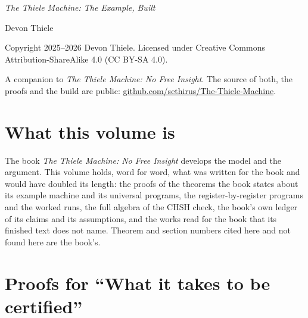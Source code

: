 \documentclass[11pt,twoside]{article}
\theoremstyle{thielethm}
\theoremstyle{thieledef}
\theoremstyle{thieledef}
\theoremstyle{thieledef}
\theoremstyle{thielethm}
\theoremstyle{thieleobs}
\theoremstyle{thielethm}
\begin{document}
\hypersetup{pageanchor=false}
\pagestyle{empty}
\vspace*{112pt}
\noindent{}

\vspace{42pt}

\vspace{7pt}
\clearpage

\vspace*{\fill}
\begingroup\footnotesize\setlength{\parindent}{0pt}\setlength{\parskip}{5pt}
\noindent\textit{The Thiele Machine: The Example, Built}

Devon Thiele

Copyright 2025--2026 Devon Thiele. Licensed under Creative Commons Attribution-ShareAlike 4.0 (CC BY-SA 4.0).

A companion to \textit{The Thiele Machine: No Free Insight}. The source of both, the proofs and the build are public:
\href{https://github.com/sethirus/The-Thiele-Machine}{github.com/sethirus/The-Thiele-Machine}.
\endgroup
\cleardoublepage
\pagestyle{book}
\hypersetup{pageanchor=true}

\section*{What this volume is}

The book \textit{The Thiele Machine: No Free Insight} develops the model and the argument. This volume holds, word for word, what was written for the book and would have doubled its length: the proofs of the theorems the book states about its example machine and its universal programs, the register-by-register programs and the worked runs, the full algebra of the CHSH check, the book's own ledger of its claims and its assumptions, and the works read for the book that its finished text does not name. Theorem and section numbers cited here and not found here are the book's.

\tableofcontents
\clearpage

\section{Proofs for ``What it takes to be certified''}
\end{document}
